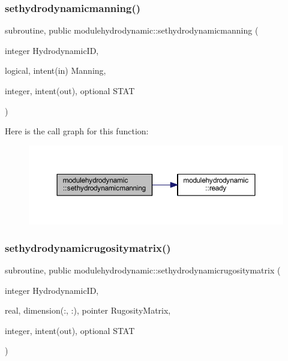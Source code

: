\subsubsection{\texorpdfstring{sethydrodynamicmanning()}{sethydrodynamicmanning()}}
{\footnotesize\ttfamily subroutine, public modulehydrodynamic\+::sethydrodynamicmanning (\begin{DoxyParamCaption}\item[{integer}]{Hydrodynamic\+ID,  }\item[{logical, intent(in)}]{Manning,  }\item[{integer, intent(out), optional}]{S\+T\+AT }\end{DoxyParamCaption})}

Here is the call graph for this function\+:\nopagebreak
\begin{figure}[H]
\begin{center}
\leavevmode
\includegraphics[width=350pt]{namespacemodulehydrodynamic_afcbe369a4cc8b78bc18a290f3e05a412_cgraph}
\end{center}
\end{figure}
\mbox{\label{namespacemodulehydrodynamic_abf6161f88fc2f65b07d9f8764a501633}} 
\subsubsection{\texorpdfstring{sethydrodynamicrugositymatrix()}{sethydrodynamicrugositymatrix()}}
{\footnotesize\ttfamily subroutine, public modulehydrodynamic\+::sethydrodynamicrugositymatrix (\begin{DoxyParamCaption}\item[{integer}]{Hydrodynamic\+ID,  }\item[{real, dimension(\+:, \+:), pointer}]{Rugosity\+Matrix,  }\item[{integer, intent(out), optional}]{S\+T\+AT }\end{DoxyParamCaption})}


